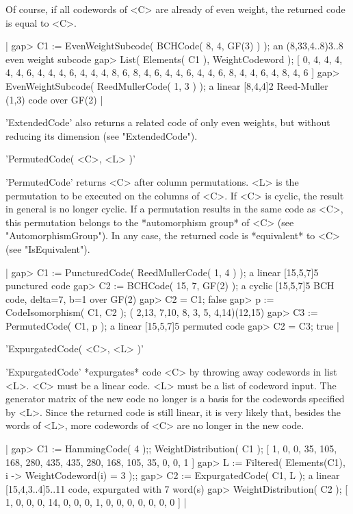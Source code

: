 Of course,  if all codewords  of  <C>  are already   of even weight,  the
returned code is equal to <C>.

|    gap> C1 := EvenWeightSubcode( BCHCode( 8, 4, GF(3) ) );
    an (8,33,4..8)3..8 even weight subcode
    gap> List( Elements( C1 ), WeightCodeword );
    [ 0, 4, 4, 4, 4, 4, 6, 4, 4, 4, 6, 4, 4, 4, 8, 6, 8, 4, 6, 4, 4, 6,
      4, 4, 6, 8, 4, 4, 6, 4, 8, 4, 6 ]
    gap> EvenWeightSubcode( ReedMullerCode( 1, 3 ) );
    a linear [8,4,4]2 Reed-Muller (1,3) code over GF(2) |

'ExtendedCode' also  returns  a related  code of  only even  weights, but
without reducing its dimension (see "ExtendedCode").


'PermutedCode( <C>, <L> )'

'PermutedCode'     returns <C> after     column  permutations. <L> is the
permutation to be executed  on the columns of  <C>. If <C> is cyclic, the
result  in general is  no longer cyclic. If  a permutation results in the
same code as <C>, this permutation belongs to the *automorphism group* of
<C>  (see "AutomorphismGroup"). In   any   case,  the returned code    is
*equivalent* to <C> (see "IsEquivalent").

|    gap> C1 := PuncturedCode( ReedMullerCode( 1, 4 ) );
    a linear [15,5,7]5 punctured code
    gap> C2 := BCHCode( 15, 7, GF(2) );
    a cyclic [15,5,7]5 BCH code, delta=7, b=1 over GF(2)
    gap> C2 = C1;
    false
    gap> p := CodeIsomorphism( C1, C2 );
    ( 2,13, 7,10, 8, 3, 5, 4,14)(12,15)
    gap> C3 := PermutedCode( C1, p );
    a linear [15,5,7]5 permuted code
    gap> C2 = C3;
    true |


'ExpurgatedCode( <C>, <L> )'

'ExpurgatedCode' *expurgates* code <C> by throwing away codewords in list
<L>.  <C> must be    a linear code. <L>   must   be a list  of   codeword
input. The generator matrix of the new code no  longer is a basis for the
codewords specified by <L>.  Since the  returned code is still linear, it
is very likely that, besides the words of <L>, more  codewords of <C> are
no longer in the new code.

|    gap> C1 := HammingCode( 4 );; WeightDistribution( C1 );
    [ 1, 0, 0, 35, 105, 168, 280, 435, 435, 280, 168, 105, 35, 0, 0, 1 ]
    gap> L := Filtered( Elements(C1), i -> WeightCodeword(i) = 3 );;
    gap> C2 := ExpurgatedCode( C1, L );
    a linear [15,4,3..4]5..11 code, expurgated with 7 word(s)
    gap> WeightDistribution( C2 );
    [ 1, 0, 0, 0, 14, 0, 0, 0, 1, 0, 0, 0, 0, 0, 0, 0 ] |

